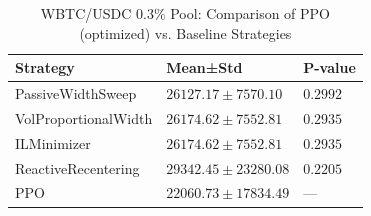 \begin{table}
\caption{WBTC/USDC 0.3\% Pool: Comparison of PPO (optimized) vs. Baseline Strategies}
\label{tab:baseline_comparison_wbtc}
\begin{tabular}{lll}
\toprule
Strategy & Mean±Std & P-value \\
\midrule
PassiveWidthSweep & $26127.17 \pm 7570.10$ & $0.2992$ \\
VolProportionalWidth & $26174.62 \pm 7552.81$ & $0.2935$ \\
ILMinimizer & $26174.62 \pm 7552.81$ & $0.2935$ \\
ReactiveRecentering & $29342.45 \pm 23280.08$ & $0.2205$ \\
PPO & $22060.73 \pm 17834.49$ & — \\
\bottomrule
\end{tabular}
\end{table}
